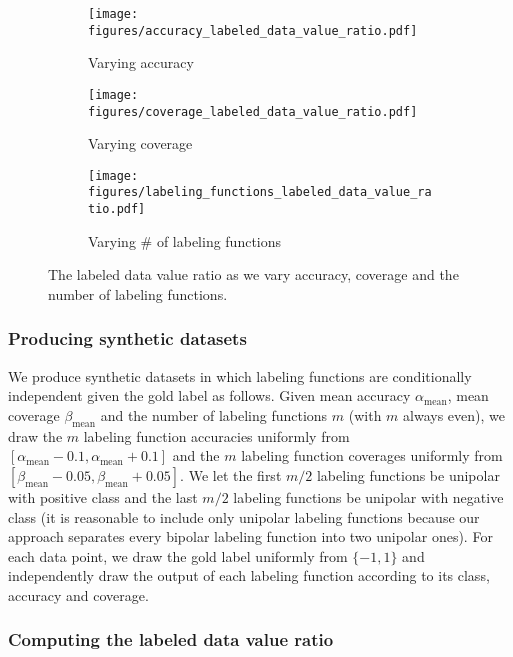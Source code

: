\begin{figure}
\centering
\begin{subfigure}{.32\textwidth}
  \centering
  \texttt{[image: figures/accuracy\_labeled\_data\_value\_ratio.pdf]}
  \caption{Varying accuracy}
  \label{fig:varying_accuracy}
\end{subfigure}%
\begin{subfigure}{.32\textwidth}
  \centering
  \texttt{[image: figures/coverage\_labeled\_data\_value\_ratio.pdf]}
  \caption{Varying coverage}
  \label{fig:varying_coverage}
\end{subfigure}
\begin{subfigure}{.32\textwidth}
  \centering
  \texttt{[image: figures/labeling\_functions\_labeled\_data\_value\_ratio.pdf]}
  \caption{Varying \# of labeling functions}
  \label{fig:varying_lfs}
\end{subfigure}
\caption{The labeled data value ratio as we vary accuracy, coverage and the number of labeling functions.}
\label{fig:varying_variables}
\end{figure}

\subsubsection{Producing synthetic datasets}

We produce synthetic datasets in which labeling functions are conditionally independent given the gold label as follows. Given mean accuracy $\alpha_\text{mean}$, mean coverage $\beta_\text{mean}$ and the number of labeling functions $m$ (with $m$ always even), we draw the $m$ labeling function accuracies uniformly from $[\alpha_\text{mean}-0.1,\alpha_\text{mean}+0.1]$ and the $m$ labeling function coverages uniformly from $[\beta_\text{mean}-0.05,\beta_\text{mean}+0.05]$. We let the first $m/2$ labeling functions be unipolar with positive class and the last $m/2$ labeling functions be unipolar with negative class (it is reasonable to include only unipolar labeling functions because our approach separates every bipolar labeling function into two unipolar ones). For each data point, we draw the gold label uniformly from $\{-1,1\}$ and independently draw the output of each labeling function according to its class, accuracy and coverage.

\subsubsection{Computing the labeled data value ratio}


